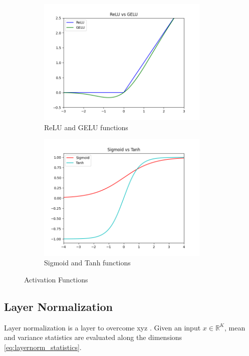 \begin{figure}
	\begin{subfigure}{.5\textwidth}
		\centering
		\includegraphics[width=0.9\textwidth]{figures/ml_theory/relu_gelu.png}
		\caption{ReLU and GELU functions}
		\label{fig:relu_gelu}
	\end{subfigure}
	\begin{subfigure}{.5\textwidth}
		\centering
		\includegraphics[width=0.9\textwidth]{figures/ml_theory/sigmoid_tanh.png}
		\caption{Sigmoid and Tanh functions}
		\label{fig:sigmoid_tanh}
	\end{subfigure}
	\caption{Activation Functions}
	\label{fig:activation_functions}
\end{figure}

\subsection{Layer Normalization}
Layer normalization is a layer to overcome xyz \cite{ba_layer_2016}. Given an input $x \in \mathbb{R}^K$, mean and variance statistics are evaluated along the dimensions \eqref{eq:layernorm_statistics}.

